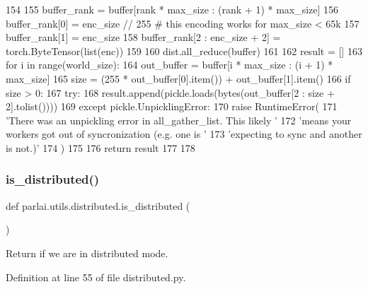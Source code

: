 \begin{DoxyCode}
154 
155     buffer\_rank = buffer[rank * max\_size : (rank + 1) * max\_size]
156     buffer\_rank[0] = enc\_size // 255  \textcolor{comment}{# this encoding works for max\_size < 65k}
157     buffer\_rank[1] = enc\_size %
158     buffer\_rank[2 : enc\_size + 2] = torch.ByteTensor(list(enc))
159 
160     dist.all\_reduce(buffer)
161 
162     result = []
163     \textcolor{keywordflow}{for} i \textcolor{keywordflow}{in} range(world\_size):
164         out\_buffer = buffer[i * max\_size : (i + 1) * max\_size]
165         size = (255 * out\_buffer[0].item()) + out\_buffer[1].item()
166         \textcolor{keywordflow}{if} size > 0:
167             \textcolor{keywordflow}{try}:
168                 result.append(pickle.loads(bytes(out\_buffer[2 : size + 2].tolist())))
169             \textcolor{keywordflow}{except} pickle.UnpicklingError:
170                 \textcolor{keywordflow}{raise} RuntimeError(
171                     \textcolor{stringliteral}{'There was an unpickling error in all\_gather\_list. This likely '}
172                     \textcolor{stringliteral}{'means your workers got out of syncronization (e.g. one is '}
173                     \textcolor{stringliteral}{'expecting to sync and another is not.)'}
174                 )
175 
176     \textcolor{keywordflow}{return} result
177 
178 
\end{DoxyCode}
\mbox{\label{namespaceparlai_1_1utils_1_1distributed_a023acb5e3b66e1f27e21247c35661279}} 
\subsubsection{\texorpdfstring{is\+\_\+distributed()}{is\_distributed()}}
{\footnotesize\ttfamily def parlai.\+utils.\+distributed.\+is\+\_\+distributed (\begin{DoxyParamCaption}{ }\end{DoxyParamCaption})}

\begin{DoxyVerb}Return if we are in distributed mode.
\end{DoxyVerb}
 

Definition at line 55 of file distributed.\+py.


